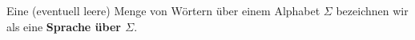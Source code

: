 %
%
Eine (eventuell leere) Menge von Wörtern über einem Alphabet \(\Sigma\) bezeichnen wir als eine \textbf{Sprache über \(\Sigma\)}.
